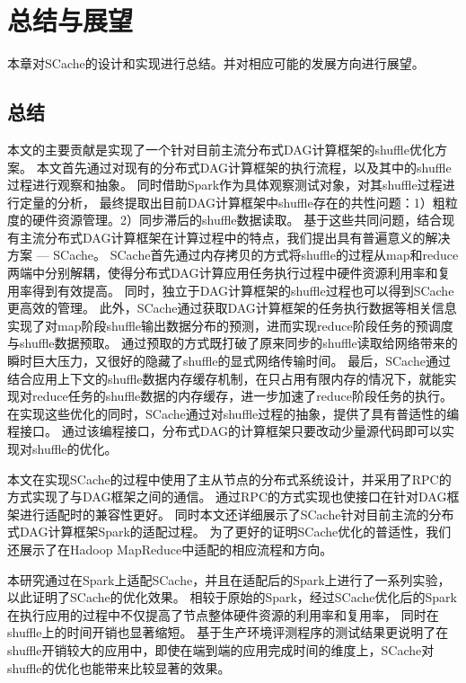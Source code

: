 
\chapter{总结与展望}
\label{chap:summary}

本章对SCache的设计和实现进行总结。并对相应可能的发展方向进行展望。

\section{总结}

本文的主要贡献是实现了一个针对目前主流分布式DAG计算框架的shuffle优化方案。
本文首先通过对现有的分布式DAG计算框架的执行流程，以及其中的shuffle过程进行观察和抽象。
同时借助Spark作为具体观察测试对象，对其shuffle过程进行定量的分析，
最终提取出目前DAG计算框架中shuffle存在的共性问题：1）粗粒度的硬件资源管理。2）同步滞后的shuffle数据读取。
基于这些共同问题，结合现有主流分布式DAG计算框架在计算过程中的特点，我们提出具有普遍意义的解决方案 --- SCache。
SCache首先通过内存拷贝的方式将shuffle的过程从map和reduce两端中分别解耦，使得分布式DAG计算应用任务执行过程中硬件资源利用率和复用率得到有效提高。
同时，独立于DAG计算框架的shuffle过程也可以得到SCache更高效的管理。
此外，SCache通过获取DAG计算框架的任务执行数据等相关信息实现了对map阶段shuffle输出数据分布的预测，进而实现reduce阶段任务的预调度与shuffle数据预取。
通过预取的方式既打破了原来同步的shuffle读取给网络带来的瞬时巨大压力，又很好的隐藏了shuffle的显式网络传输时间。
最后，SCache通过结合应用上下文的shuffle数据内存缓存机制，在只占用有限内存的情况下，就能实现对reduce任务的shuffle数据的内存缓存，进一步加速了reduce阶段任务的执行。
在实现这些优化的同时，SCache通过对shuffle过程的抽象，提供了具有普适性的编程接口。
通过该编程接口，分布式DAG的计算框架只要改动少量源代码即可以实现对shuffle的优化。

本文在实现SCache的过程中使用了主从节点的分布式系统设计，并采用了RPC的方式实现了与DAG框架之间的通信。
通过RPC的方式实现也使接口在针对DAG框架进行适配时的兼容性更好。
同时本文还详细展示了SCache针对目前主流的分布式DAG计算框架Spark的适配过程。
为了更好的证明SCache优化的普适性，我们还展示了在Hadoop MapReduce中适配的相应流程和方向。

本研究通过在Spark上适配SCache，并且在适配后的Spark上进行了一系列实验，以此证明了SCache的优化效果。
相较于原始的Spark，经过SCache优化后的Spark在执行应用的过程中不仅提高了节点整体硬件资源的利用率和复用率，
同时在shuffle上的时间开销也显著缩短。
基于生产环境评测程序的测试结果更说明了在shuffle开销较大的应用中，即使在端到端的应用完成时间的维度上，SCache对shuffle的优化也能带来比较显著的效果。

